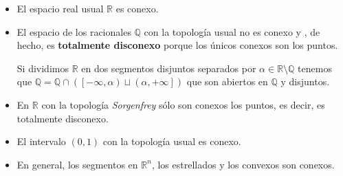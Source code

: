 \begin{ej}
\begin{itemize}
    \item El espacio real usual $\mathbb{R}$ es conexo.
    \item El espacio de los racionales $\mathbb{Q}$ con la topología usual no es conexo y , de hecho, es \textbf{totalmente disconexo} porque los únicos conexos son los puntos.
    \begin{demo}
        Si dividimos $\mathbb{R}$ en dos segmentos disjuntos separados por $\alpha \in \mathbb{R} \setminus \mathbb{Q}$ tenemos que $\mathbb{Q} = \mathbb{Q} \cap \left( \left[ -\infty, \alpha \right) \sqcup \left( \alpha, +\infty \right] \right)$ que son abiertos en $\mathbb{Q}$ y disjuntos.
    \end{demo}
    \item En $\mathbb{R}$ con la topología \textit{Sorgenfrey} sólo son conexos los puntos, es decir, es totalmente disconexo.
    \item El intervalo $\left( 0, 1 \right)$ con la topología usual es conexo. 
    \item En general, los segmentos en $\mathbb{R}^n$, los estrellados y los convexos son conexos.
\end{itemize}
\end{ej}

